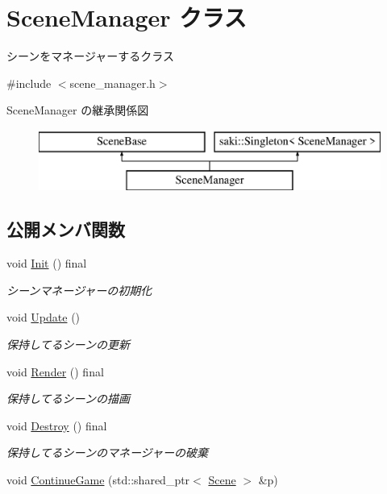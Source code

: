 \hypertarget{class_scene_manager}{}\section{Scene\+Manager クラス}
\label{class_scene_manager}


シーンをマネージャーするクラス  




{\ttfamily \#include $<$scene\+\_\+manager.\+h$>$}

Scene\+Manager の継承関係図\begin{figure}[H]
\begin{center}
\leavevmode
\includegraphics[height=2.000000cm]{class_scene_manager}
\end{center}
\end{figure}
\subsection*{公開メンバ関数}
\begin{DoxyCompactItemize}
\item 
void \mbox{\hyperlink{class_scene_manager_a6c0e84d0e76f23fb3172839dba5f091b}{Init}} () final
\begin{DoxyCompactList}\small\item\em シーンマネージャーの初期化 \end{DoxyCompactList}\item 
void \mbox{\hyperlink{class_scene_manager_a63dcf65832d6a2c190bf496d9a3b00a3}{Update}} ()
\begin{DoxyCompactList}\small\item\em 保持してるシーンの更新 \end{DoxyCompactList}\item 
void \mbox{\hyperlink{class_scene_manager_a968ae7a0065b793f139bda6bcc58d106}{Render}} () final
\begin{DoxyCompactList}\small\item\em 保持してるシーンの描画 \end{DoxyCompactList}\item 
void \mbox{\hyperlink{class_scene_manager_a0e3ad11342e763f0d4108c0b4674a157}{Destroy}} () final
\begin{DoxyCompactList}\small\item\em 保持してるシーンのマネージャーの破棄 \end{DoxyCompactList}\item 
void \mbox{\hyperlink{class_scene_manager_a5ed223ec14c6b62d378b3f95ed4f5d8e}{Continue\+Game}} (std\+::shared\+\_\+ptr$<$ \mbox{\hyperlink{class_scene}{Scene}} $>$ \&p)
\end{DoxyCompactItemize}
